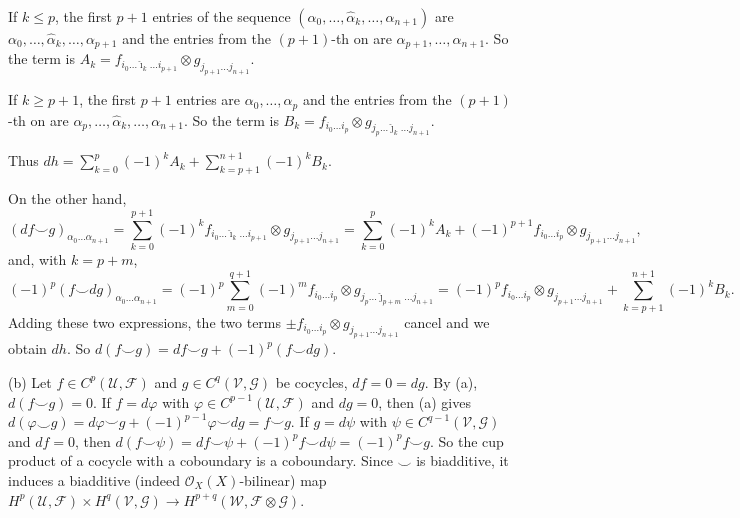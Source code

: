 \documentclass[11pt]{article}
\begin{document}
If $k\le p$, the first $p+1$ entries of the sequence $(\alpha_0,\dots,\hat\alpha_k,\dots,\alpha_{n+1})$ are $\alpha_0,\dots,\hat\alpha_k,\dots,\alpha_{p+1}$ and the entries from the $(p+1)$-th on are $\alpha_{p+1},\dots,\alpha_{n+1}$. So the term is $A_k=f_{i_0\dots\hat\imath_k\dots i_{p+1}}\otimes g_{j_{p+1}\dots j_{n+1}}$.

If $k\ge p+1$, the first $p+1$ entries are $\alpha_0,\dots,\alpha_p$ and the entries from the $(p+1)$-th on are $\alpha_p,\dots,\hat\alpha_k,\dots,\alpha_{n+1}$. So the term is $B_k=f_{i_0\dots i_p}\otimes g_{j_p\dots\hat\jmath_k\dots j_{n+1}}$.

Thus $dh=\sum_{k=0}^{p}(-1)^kA_k+\sum_{k=p+1}^{n+1}(-1)^kB_k$.

On the other hand,
\[ (df\smile g)_{\alpha_0\dots\alpha_{n+1}}=\sum_{k=0}^{p+1}(-1)^kf_{i_0\dots\hat\imath_k\dots i_{p+1}}\otimes g_{j_{p+1}\dots j_{n+1}}=\sum_{k=0}^{p}(-1)^kA_k+(-1)^{p+1}f_{i_0\dots i_p}\otimes g_{j_{p+1}\dots j_{n+1}}, \]
and, with $k=p+m$,
\[ (-1)^p(f\smile dg)_{\alpha_0\dots\alpha_{n+1}}=(-1)^p\sum_{m=0}^{q+1}(-1)^mf_{i_0\dots i_p}\otimes g_{j_p\dots\hat\jmath_{p+m}\dots j_{n+1}}=(-1)^pf_{i_0\dots i_p}\otimes g_{j_{p+1}\dots j_{n+1}}+\sum_{k=p+1}^{n+1}(-1)^kB_k. \]
Adding these two expressions, the two terms $\pm f_{i_0\dots i_p}\otimes g_{j_{p+1}\dots j_{n+1}}$ cancel and we obtain $dh$. So $d(f\smile g)=df\smile g+(-1)^p(f\smile dg)$.

(b) Let $f\in C^p(\mathcal U,\mathcal F)$ and $g\in C^q(\mathcal V,\mathcal G)$ be cocycles, $df=0=dg$. By (a), $d(f\smile g)=0$. If $f=d\varphi$ with $\varphi\in C^{p-1}(\mathcal U,\mathcal F)$ and $dg=0$, then (a) gives $d(\varphi\smile g)=d\varphi\smile g+(-1)^{p-1}\varphi\smile dg=f\smile g$. If $g=d\psi$ with $\psi\in C^{q-1}(\mathcal V,\mathcal G)$ and $df=0$, then $d(f\smile\psi)=df\smile\psi+(-1)^pf\smile d\psi=(-1)^pf\smile g$. So the cup product of a cocycle with a coboundary is a coboundary. Since $\smile$ is biadditive, it induces a biadditive (indeed $\mathcal O_X(X)$-bilinear) map $H^p(\mathcal U,\mathcal F)\times H^q(\mathcal V,\mathcal G)\to H^{p+q}(\mathcal W,\mathcal F\otimes\mathcal G)$.
\end{document}
